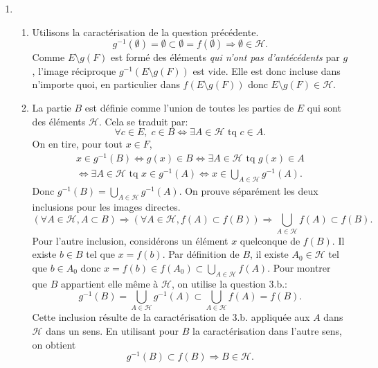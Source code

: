 \begin{enumerate}
  \item
\begin{enumerate}
  \item Utilisons la caractérisation de la question précédente.
\begin{displaymath}
  g^{-1}(\emptyset) = \emptyset \subset \emptyset = f(\emptyset) \Rightarrow \emptyset \in \mathcal{H}.
\end{displaymath}
Comme $E\setminus g(F)$ est formé des éléments \emph{qui n'ont pas d'antécédents} par $g$, l'image réciproque $g^{-1}(E\setminus g(F))$ est vide. Elle est donc incluse dans n'importe quoi, en particulier dans $f(E\setminus g(F))$ donc $E\setminus g(F)\in \mathcal{H}$.
  \item La partie $B$ est définie comme l'union de toutes les parties de $E$ qui sont des éléments $\mathcal{H}$. Cela se traduit par:
\begin{displaymath}
\forall c\in E, \; c\in B \Leftrightarrow \exists A\in \mathcal{H} \text{ tq } c\in A .
\end{displaymath}
On en tire, pour tout $x\in F$,
\begin{multline*}
x\in g^{-1}(B) \Leftrightarrow g(x)\in B 
\Leftrightarrow \exists A\in \mathcal{H} \text{ tq } g(x) \in A \\
\Leftrightarrow \exists A\in \mathcal{H} \text{ tq } x \in g^{-1}(A)
\Leftrightarrow x \in \bigcup_{A\in \mathcal{H}}g^{-1}(A) .
\end{multline*}
Donc $g^{-1}(B) = \bigcup_{A\in \mathcal{H}}g^{-1}(A)$.\newline
On prouve séparément les deux inclusions pour les images directes.
\begin{displaymath}
\left( \forall A\in \mathcal{H}, A \subset B\right) 
\Rightarrow \left( \forall A\in \mathcal{H}, f(A) \subset f(B)\right)
\Rightarrow \bigcup_{A \in \mathcal{H}}f(A) \subset f(B) .
\end{displaymath}
Pour l'autre inclusion, considérons un élément $x$ quelconque de $f(B)$. Il existe $b\in B$ tel que $x=f(b)$. Par définition de $B$, il existe $A_0\in \mathcal{H}$ tel que $b\in A_0$ donc $x=f(b)\in f(A_0)\subset \bigcup_{A\in \mathcal{H}}f(A)$.\newline
Pour montrer que $B$ appartient elle même à $\mathcal{H}$, on utilise la question 3.b.:
\begin{displaymath}
  g^{-1}(B) = \bigcup_{A \in \mathcal{H}}g^{-1}(A) \subset \bigcup_{A \in \mathcal{H}}f(A) = f(B) .
\end{displaymath}
Cette inclusion résulte de la caractérisation de 3.b. appliquée aux $A$ dans $\mathcal{H}$ dans un sens. En utilisant pour $B$ la caractérisation dans l'autre sens, on obtient
\begin{displaymath}
 g^{-1}(B) \subset f(B) \Rightarrow B \in \mathcal{H}.
\end{displaymath}
\end{enumerate}


\end{enumerate}
